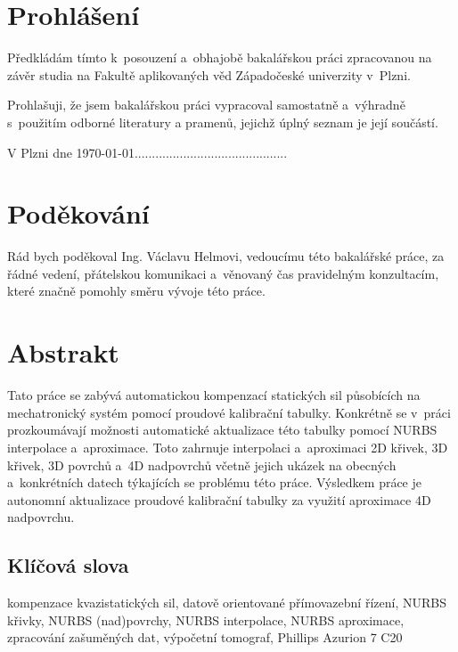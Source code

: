 

\section*{Prohlášení}
Předkládám tímto k~posouzení a~obhajobě bakalářskou práci zpracovanou
na závěr studia na Fakultě aplikovaných věd Západočeské univerzity v~Plzni.
\par
Prohlašuji, že jsem bakalářskou práci vypracoval samostatně a~výhradně s~použitím odborné literatury
a pramenů, jejichž úplný seznam je její součástí.
\par
\vspace{5mm}
V Plzni dne \today \hfill ............................................
\section*{Poděkování}
Rád bych poděkoval Ing. Václavu Helmovi, vedoucímu této bakalářské práce, za řádné vedení, přátelskou komunikaci a~věnovaný čas pravidelným konzultacím, které značně pomohly směru vývoje této práce.
\newpage
\section*{Abstrakt}
Tato práce se zabývá automatickou kompenzací statických sil působících na mechatronický systém pomocí proudové kalibrační tabulky. Konkrétně se v~práci prozkoumávají možnosti automatické aktualizace této tabulky pomocí NURBS interpolace a~aproximace. Toto zahrnuje interpolaci a~aproximaci 2D křivek, 3D křivek, 3D povrchů a~4D nadpovrchů včetně jejich ukázek na obecných a~konkrétních datech týkajících se problému této práce. Výsledkem práce je autonomní aktualizace proudové kalibrační tabulky za využití aproximace 4D nadpovrchu.
\subsection*{Klíčová slova}
kompenzace kvazistatických sil, datově orientované přímovazební řízení, NURBS křivky, NURBS (nad)povrchy, NURBS interpolace, NURBS aproximace, zpracování zašuměných dat, výpočetní tomograf, Phillips Azurion 7 C20
